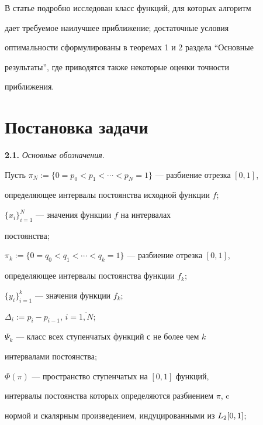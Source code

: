 В статье подробно исследован класс функций, для которых алгоритм


дает требуемое наилучшее приближение; достаточные условия


оптимальности сформулированы в теоремах 1 и 2 раздела ``Основные


результаты'', где приводятся также некоторые оценки точности


приближения.








\section{Постановка задачи}





{\bf 2.1.} {\it Основные обозначения.}


Пусть $\pi_N:=\{0=p_0<p_1<\dotsb<p_N=1\}$ --- разбиение отрезка $[0,1]$,


определяющее интервалы постоянства исходной функции $f$;





$\{x_i\}_{i=1}^N$ --- значения функции $f$ на интервалах


постоянства;





$\pi_k:=\{0=q_0<q_1<\dotsb<q_k=1\}$ --- разбиение отрезка $[0,1]$,


определяющее интервалы постоянства функции $f_k$;





$\{y_i\}_{i=1}^k$ --- значения функции $f_k$;


$\Delta_i:=p_i-p_{i-1}$, $i=\overline{1,N}$;





$\Psi_k$ --- класс всех ступенчатых функций с не более чем $k$


интервалами постоянства;





$\Phi(\pi)$ --- пространство ступенчатых на $[0,1]$ функций,


интервалы постоянства которых определяются разбиением $\pi$, c


нормой и скалярным произведением, индуцированными из $L_2[0,1]$;





